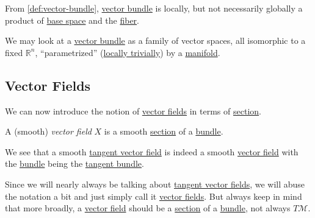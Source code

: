 \begin{remark}
	From \autoref{def:vector-bundle}, \hyperref[def:vector-bundle]{vector bundle} is locally, but not necessarily globally a product of \hyperref[def:base-space]{base space} and the \hyperref[def:fiber]{fiber}.
\end{remark}

\begin{intuition}
	We may look at a \hyperref[def:vector-bundle]{vector bundle} as a family of vector spaces, all isomorphic to a fixed \(\mathbb{R} ^n\), ``parametrized'' (\hyperref[def:local-trivialization]{locally trivially}) by a \hyperref[def:smooth-manifold]{manifold}.
\end{intuition}

\subsection{Vector Fields}
We can now introduce the notion of \hyperref[def:vector-field]{vector fields} in terms of \hyperref[def:section]{section}.

\begin{definition}\label{def:vector-field*}
	A (smooth) \emph{vector field} \(X\) is a smooth \hyperref[def:section]{section} of a \hyperref[def:bundle]{bundle}.
\end{definition}

\begin{note}
	We see that a smooth \hyperref[def:vector-field]{tangent vector field} is indeed a smooth \hyperref[def:vector-field*]{vector field} with the \hyperref[def:bundle]{bundle} being the \hyperref[def:tangent-bundle]{tangent bundle}.
\end{note}

\begin{notation}
	Since we will nearly always be talking about \hyperref[def:vector-field]{tangent vector fields}, we will abuse the notation a bit and just simply call it \hyperref[def:vector-field]{vector fields}. But always keep in mind that more broadly, a \hyperref[def:vector-field*]{vector field} should be a \hyperref[def:section]{section} of a \hyperref[def:bundle]{bundle}, not always \(T \mathcal{M} \).
\end{notation}